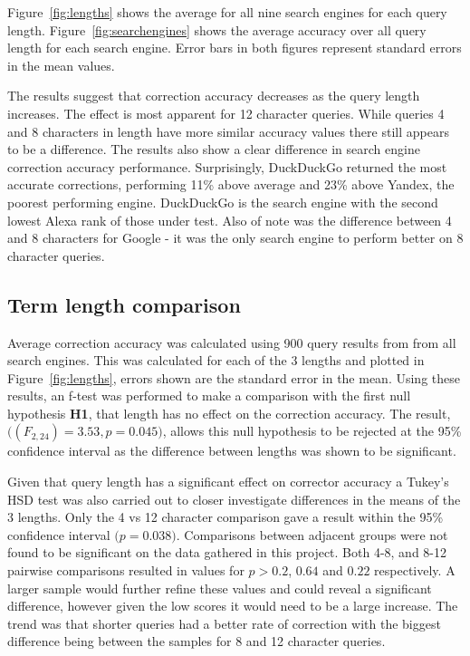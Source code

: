 \documentclass{csfourzero}
\begin{document}
Figure~\ref{fig:lengths} shows the average for all nine search engines for each query length. Figure~\ref{fig:searchengines} shows the average accuracy over all query length for each search engine. Error bars in both figures represent standard errors in the mean values.

The results suggest that correction accuracy decreases as the query length increases. The effect is most apparent for 12 character queries. While queries 4 and 8 characters in length have more similar accuracy values there still appears to be a difference. The results also show a clear difference in search engine correction accuracy performance. Surprisingly, DuckDuckGo returned the most accurate corrections, performing 11\% above average and 23\% above Yandex, the poorest performing engine. DuckDuckGo is the search engine with the second lowest Alexa rank of those under test. Also of note was the difference between 4 and 8 characters for Google - it was the only search engine to perform better on 8 character queries.

\subsection{Term length comparison}
Average correction accuracy was calculated using 900 query results from from all search engines. This was calculated for each of the 3 lengths and plotted in Figure~\ref{fig:lengths}, errors shown are the standard error in the mean. Using these results, an f-test was performed to make a comparison with the first null hypothesis \textbf{H1}, that length has no effect on the correction accuracy. The result, $\big((F_{2,24}) = 3.53, p = 0.045\big)$, allows this null hypothesis to be rejected at the 95\% confidence interval as the difference between lengths was shown to be significant.

Given that query length has a significant effect on corrector accuracy a Tukey's HSD test was also carried out to closer investigate differences in the means of the 3 lengths. Only the 4 vs 12 character comparison gave a result within the 95\% confidence interval $\big(p = 0.038\big)$. Comparisons between adjacent groups were not found to be significant on the data gathered in this project. Both 4-8, and 8-12 pairwise comparisons resulted in values for $p > 0.2$, $0.64$ and $0.22$ respectively. A larger sample would further refine these values and could reveal a significant difference, however given the low scores it would need to be a large increase. The trend was that shorter queries had a better rate of correction with the biggest difference being between the samples for 8 and 12 character queries.
\end{document}
